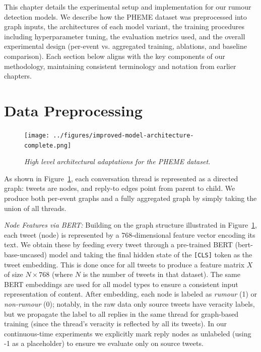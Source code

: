 \documentclass{cshonours}
\begin{document}
This chapter details the experimental setup and implementation for our rumour detection models. We describe how the PHEME dataset was preprocessed into graph inputs, the architectures of each model variant, the training procedures including hyperparameter tuning, the evaluation metrics used, and the overall experimental design (per-event vs. aggregated training, ablations, and baseline comparison). Each section below aligns with the key components of our methodology, maintaining consistent terminology and notation from earlier chapters.

\section{Data Preprocessing}

\begin{figure}[ht]
  \centering
  \texttt{[image: ../figures/improved-model-architecture-complete.png]}
  \caption[Conversion of a PHEME conversation thread]{\textit{High level architectural adaptations for the PHEME dataset.}}
  \label{fig:pheme-graph}
\end{figure}

As shown in Figure~\ref{fig:pheme-graph}, each conversation thread is represented as a directed graph: tweets are nodes, and reply-to edges point from parent to child. We produce both per-event graphs and a fully aggregated graph by simply taking the union of all threads.


\emph{Node Features via BERT:} Building on the graph structure illustrated in Figure~\ref{fig:pheme-graph}, each tweet (node) is represented by a 768-dimensional feature vector encoding its text. We obtain these by feeding every tweet through a pre-trained BERT (bert-base-uncased) model and taking the final hidden state of the \texttt{[CLS]} token as the tweet embedding. This is done once for all tweets to produce a feature matrix $X$ of size $N \times 768$ (where $N$ is the number of tweets in that dataset). The same BERT embeddings are used for all model types to ensure a consistent input representation of content. After embedding, each node is labeled as \emph{rumour} (1) or \emph{non-rumour} (0); notably, in the raw data only source tweets have veracity labels, but we propagate the label to all replies in the same thread for graph-based training (since the thread's veracity is reflected by all its tweets). In our continuous-time experiments we explicitly mark reply nodes as unlabeled (using -1 as a placeholder) to ensure we evaluate only on source tweets.
\end{document}

